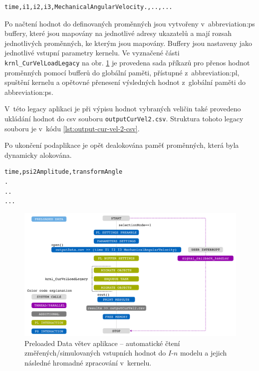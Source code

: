 \documentclass[a4paper, twoside, 11pt]{article}
\begin{document}
	\begin{lstlisting}[language={Text}, caption={Struktura souboru outputData, ze kterého jsou načítány hodnoty pro akcelerovaný kernel.}, label={lst:output-data-csv-struktura}]
time,i1,i2,i3,MechanicalAngularVelocity.,..,...
\end{lstlisting}
	Po načtení hodnot do definovaných proměnných jsou vytvořeny v~\gls{abbreviation:ps} buffery, které jsou mapovány na jednotlivé adresy ukazatelů a mají rozsah jednotlivých proměnných, ke kterým jsou mapovány. Buffery jsou nastaveny jako jednotlivé vstupní parametry kernelu. Ve vyznačené části \texttt{krnl\_CurVelLoadLegacy} na obr. \ref{fig:preloaded-data} je provedena sada příkazů pro přenos hodnot proměnných pomocí bufferů do globální paměti, přístupné z~\gls{abbreviation:pl}, spuštění kernelu a opětovné přenesení výsledných hodnot z~globální paměti do \gls{abbreviation:ps}.\par
	V~této legacy aplikaci je při výpisu hodnot vybraných veličin také provedeno ukládání hodnot do csv souboru \texttt{outputCurVel2.csv}. Struktura tohoto legacy souboru je v~kódu \ref{lst:output-cur-vel-2-csv}.\par
	Po ukončení podaplikace je opět dealokována paměť proměnných, která byla dynamicky alokována.

	\begin{lstlisting}[language={Text}, caption={Struktura souboru outputCurVel2.csv, do něhož jsou umisťovány výstupní hodnoty vybraných veličin, vypočtených pomocí akcelerované aplikace.}, label={lst:output-cur-vel-2-csv}]
time,psi2Amplitude,transformAngle
.
..
...\end{lstlisting}



		\begin{figure}[htbp!]
		   \centering
		   \includegraphics[width=1\textwidth]{src/pdf/preloaded-data.pdf}
		   \caption{Preloaded Data větev aplikace – automatické čtení změřených/simulovaných vstupních hodnot do $I$-$n$ modelu a jejich následné hromadné zpracování v~kernelu.}
		   \label{fig:preloaded-data}
	   \end{figure}
\end{document}
